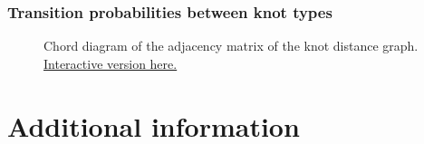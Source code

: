 \documentclass[presentation]{beamer}
\begin{document}
\begin{frame}
  \frametitle{Transition probabilities between knot types}
  \begin{figure}
    \centering
    \def\svgwidth{0.6\textheight}
    
    \caption{Chord diagram of the adjacency matrix of the knot
      distance graph. \href{http://hchapman.github.io/research/9x_chords.html}{Interactive version here.}}
    \label{fig:chorddia}
  \end{figure}
\end{frame}

\section{Additional information}

\end{document}
